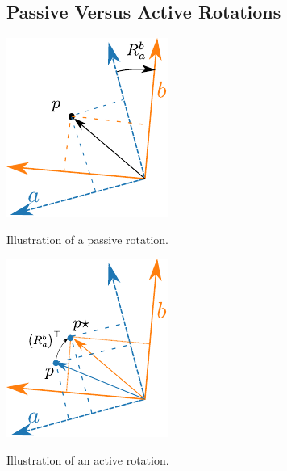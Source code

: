 \subsection{Passive Versus Active Rotations}

\begin{marginfigure}[-7in]
\includegraphics[width=0.8\linewidth]{chap2_preliminaries/figures/rotation_passive}
\caption{Illustration of a passive rotation.}
\label{fig:passive_rotation}
\end{marginfigure}

\begin{marginfigure}[-3in]
\includegraphics[width=0.8\linewidth]{chap2_preliminaries/figures/rotation_active}
\caption{Illustration of an active rotation.}
\label{fig:active_rotation}
\end{marginfigure}


